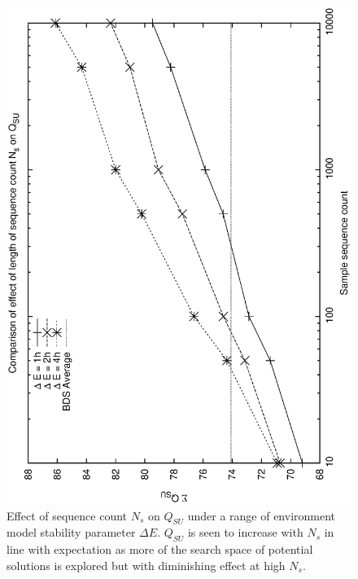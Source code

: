 \begin{figure}[htp]
\begin{center}
  \includegraphics[scale=0.5, angle=-90]{figures/ns_env_su.eps}
\caption[Effect of sequence count $N_s$ on $Q_{SU}$ under a range of environmental conditions]
{Effect of sequence count $N_s$ on $Q_{SU}$ under a range of environment model stability parameter $\Delta E$. $Q_{SU}$ is seen to increase with $N_s$ in line with expectation as more of the search space of potential solutions is explored but with diminishing effect at high $N_s$.}
\label{fig:ns_denv}
\end{center}
\end{figure}
